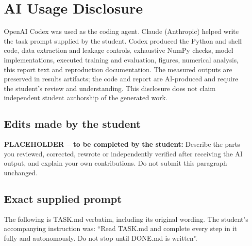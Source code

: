 \documentclass[11pt,a4paper]{article}
\begin{document}
\clearpage\section*{AI Usage Disclosure}
OpenAI Codex was used as the coding agent. Claude (Anthropic) helped write the task prompt supplied by the student. Codex produced the Python and shell code, data extraction and leakage controls, exhaustive NumPy checks, model implementations, executed training and evaluation, figures, numerical analysis, this report text and reproduction documentation. The measured outputs are preserved in results artifacts; the code and report are AI-produced and require the student's review and understanding. This disclosure does not claim independent student authorship of the generated work.

\subsection*{Edits made by the student}
\textbf{PLACEHOLDER -- to be completed by the student:} Describe the parts you reviewed, corrected, rewrote or independently verified after receiving the AI output, and explain your own contributions. Do not submit this paragraph unchanged.

\subsection*{Exact supplied prompt}
The following is TASK.md verbatim, including its original wording. The student's accompanying instruction was: ``Read TASK.md and complete every step in it fully and autonomously. Do not stop until DONE.md is written''.
\end{document}
